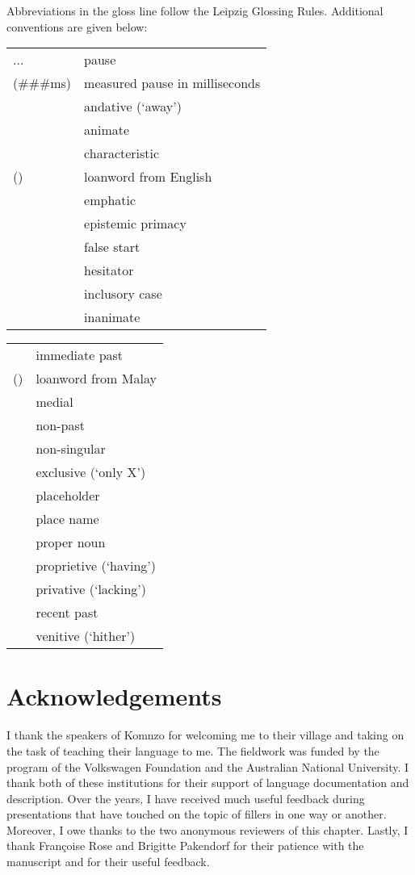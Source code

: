 \documentclass[output=paper,colorlinks,citecolor=brown]{langscibook}
\begin{document}
Abbreviations in the gloss line follow the Leipzig Glossing Rules. Additional conventions are given below:\medskip\\
\noindent\begin{tabularx}{.5\textwidth}[t]{@{}lQ@{}}
... & pause\\
(\#\#\#ms) & measured pause in milliseconds\\
 & andative (`away')\\
 & animate\\
 & characteristic\\
() & loanword from English\\
 & emphatic\\
 & epistemic primacy\\
 & false start\\
 & hesitator\\
 & inclusory case\\
 & inanimate\\
\end{tabularx}%
\begin{tabularx}{.5\textwidth}[t]{@{}lQ@{}}
 & immediate past\\
() & loanword from Malay\\
 & medial\\
 & non-past\\
 & non-singular\\
 & exclusive (`only X')\\
 & placeholder\\
 & place name\\
 & proper noun\\
 & proprietive (`having')\\
 & privative (`lacking')\\
 & recent past\\
 & venitive (`hither')\\
\end{tabularx}

\section*{Acknowledgements}
I thank the speakers of Komnzo for welcoming me to their village and taking on the task of teaching their language to me. The fieldwork was funded by the  program of the Volkswagen Foundation and the Australian National University. I thank both of these institutions for their support of language documentation and description. Over the years, I have received much useful feedback during presentations that have touched on the topic of fillers in one way or another. Moreover, I owe thanks to the two anonymous reviewers of this chapter. Lastly, I thank Françoise Rose and Brigitte Pakendorf for their patience with the manuscript and for their useful feedback.

{\sloppy\printbibliography[heading=subbibliography,notkeyword=this]}
\end{document}

